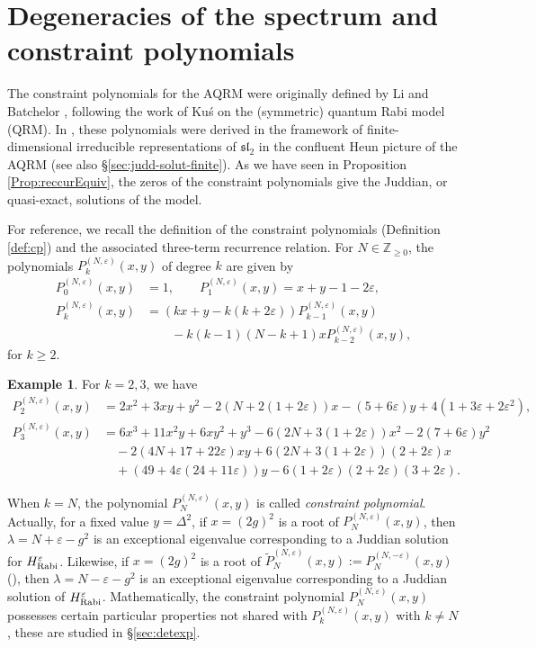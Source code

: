 \documentclass[11pt]{article}
\numberwithin{equation}{section}
\newcommand{\Z}{\mathbb{Z}} %
\newcommand{\e}{\varepsilon}
\newcommand{\HRabi}[1]{H_{\text{\upshape Rabi}}^{#1}} %
\newcommand{\cp}[2]{P^{(#1)}_{#2}} %
\theoremstyle{plain}
\theoremstyle{definition}
\newtheorem{ex}{Example}[section]
\theoremstyle{remark}
\begin{document}
\section{Degeneracies of the spectrum and constraint polynomials}\label{sec:constPoly}

The constraint polynomials for the AQRM were originally defined by Li and Batchelor \cite{LB2015JPA}, following the work of Ku\'s \cite{K1985JMP} on the (symmetric) quantum Rabi model (QRM). In \cite{WY2014JPA,W2016JPA}, these polynomials were derived in the framework of finite-dimensional irreducible representations of $\mathfrak{sl}_2$ in the confluent Heun picture of the AQRM (see also \S \ref{sec:judd-solut-finite}). As we have seen in Proposition \ref{Prop:reccurEquiv}, the zeros of the constraint polynomials give the Juddian, or quasi-exact, solutions of the model. 

For reference, we recall the definition of the constraint polynomials (Definition \ref{def:cp}) and the associated three-term recurrence relation. For $ N \in \Z_{\geq 0}$, the polynomials \(\cp{N,\e}{k}(x,y)\) of degree $k$ are given by
\begin{align*}
  \cp{N,\e}{0}(x,y) &= 1, \qquad \cp{N,\e}{1}(x,y) = x + y - 1 - 2 \e, \\
  \cp{N,\e}{k}(x,y) &= (k x + y - k(k + 2 \e) ) P_{k-1}^{(N,\e)}(x,y) \\
                    &\qquad  - k(k-1)(N-k+1) x P_{k-2}^{(N,\e)}(x,y),
\end{align*}
for \(k \geq 2 \).

\begin{ex}
  For \(k=2,3\), we have
  \begin{align*}
    \cp{N,\e}{2}(x,y) &= 2 x^2 + 3 x y + y^2 - 2( N +  2(1+2\e)) x - (5+6\e) y + 4(1+3\e + 2\e^2), \\
    \cp{N,\e}{3}(x,y) &= 6 x^3 + 11 x^2 y + 6 x y^2 + y^3 - 6(2 N + 3(1+2\e))x^2 - 2(7+6\e) y^2 \\
                      &\quad{} - 2 (4 N +  17 + 22\e) x y  + 6 (2 N + 3(1+2\e))(2+2\e) x \\
                      &\quad{} + (49 + 4\e (24 + 11\e)) y - 6(1+2\e)(2+2\e)(3+2\e).
  \end{align*}
\end{ex}

When \(k = N\), the polynomial \(\cp{N,\e}{N}(x,y)\) is called {\em constraint polynomial}.
Actually, for a fixed value \(y = \Delta^2 \), if \(x = (2g)^2\) is a root of \( \cp{N,\e}{N}(x,y)\), then
\( \lambda =   N + \e - g^2 \) is an exceptional eigenvalue corresponding to a Juddian solution for \(\HRabi{\e}\).
Likewise, if \(x = (2g)^2\) is a root of \(\tilde{P}_N^{(N,\e)}(x,y):=\cp{N,-\e}{N}(x,y)\) (\cite{W2016JPA,RW2017}), then
\( \lambda =  N - \e - g^2  \) is an exceptional eigenvalue corresponding to a Juddian solution of \(\HRabi{\e}\). Mathematically,
the constraint polynomial \( \cp{N,\e}{N}(x,y)\) possesses certain particular properties not shared with \( \cp{N,\e}{k}(x,y)\)
with \(k \not= N\), these are studied in \S \ref{sec:detexp}.
\end{document}
